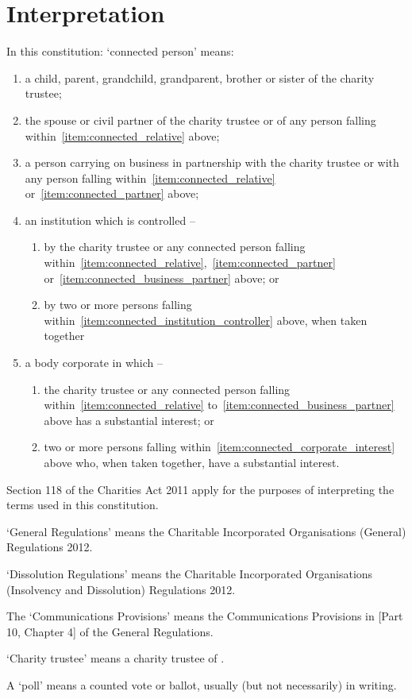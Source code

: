\section{Interpretation}\label{sec:interpretation}
In this constitution: `connected person' means:
\begin{enumerate}
    \item\label{item:connected_relative} a child, parent, grandchild, grandparent, brother or sister of the charity trustee;
    \item\label{item:connected_partner} the spouse or civil partner of the charity trustee or of any person falling within~\ref{item:connected_relative} above;
    \item\label{item:connected_business_partner} a person carrying on business in partnership with the charity trustee or with any person falling within~\ref{item:connected_relative} or~\ref{item:connected_partner} above;
    \item an institution which is controlled –
    \begin{enumerate}
        \item\label{item:connected_institution_controller} by the charity trustee or any connected person falling within~\ref{item:connected_relative},~\ref{item:connected_partner} or~\ref{item:connected_business_partner} above; or
        \item  by two or more persons falling within~\ref{item:connected_institution_controller} above, when taken together
    \end{enumerate}
    \item a body corporate in which –
    \begin{enumerate}
        \item\label{item:connected_corporate_interest} the charity trustee or any connected person falling within~\ref{item:connected_relative} to~\ref{item:connected_business_partner} above has a substantial interest; or
        \item  two or more persons falling within~\ref{item:connected_corporate_interest} above who, when taken together, have a substantial interest.
    \end{enumerate}
\end{enumerate}
Section 118 of the Charities Act 2011 apply for the purposes of interpreting the terms used in this constitution.

`General Regulations' means the Charitable Incorporated Organisations (General) Regulations 2012.

`Dissolution Regulations' means the Charitable Incorporated Organisations (Insolvency and Dissolution) Regulations 2012.

The `Communications Provisions' means the Communications Provisions in [Part 10, Chapter 4] of the General Regulations.

`Charity trustee' means a charity trustee of \shortname{}.

A `poll' means a counted vote or ballot, usually (but not necessarily) in writing.

